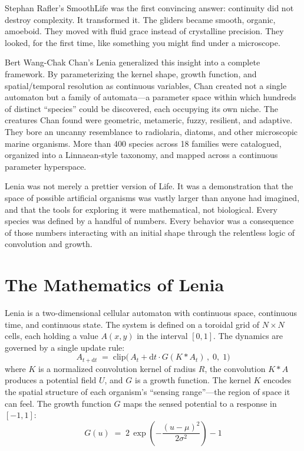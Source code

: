 \documentclass[11pt,a4paper]{article}
\begin{document}
Stephan Rafler's SmoothLife \citep{rafler2011} was the first convincing
answer: continuity did not destroy complexity. It transformed it. The
gliders became smooth, organic, amoeboid. They moved with fluid grace
instead of crystalline precision. They looked, for the first time, like
something you might find under a microscope.

Bert Wang-Chak Chan's Lenia \citep{chan2019,chan2020} generalized this
insight into a complete framework. By parameterizing the kernel shape,
growth function, and spatial/temporal resolution as continuous variables,
Chan created not a single automaton but a family of automata---a parameter
space within which hundreds of distinct ``species'' could be discovered,
each occupying its own niche. The creatures Chan found were geometric,
metameric, fuzzy, resilient, and adaptive. They bore an uncanny resemblance
to radiolaria, diatoms, and other microscopic marine organisms. More than
400 species across 18 families were catalogued, organized into a
Linnaean-style taxonomy, and mapped across a continuous parameter
hyperspace.

Lenia was not merely a prettier version of Life. It was a demonstration that
the space of possible artificial organisms was vastly larger than anyone had
imagined, and that the tools for exploring it were mathematical, not
biological. Every species was defined by a handful of numbers. Every
behavior was a consequence of those numbers interacting with an initial
shape through the relentless logic of convolution and growth.

\section{The Mathematics of Lenia}

Lenia is a two-dimensional cellular automaton with continuous space,
continuous time, and continuous state. The system is defined on a toroidal
grid of $N\times N$ cells, each holding a value $A(x,y)$ in the interval
$[0,1]$. The dynamics are governed by a single update rule:
\begin{equation}
A_{t+\mathrm{d}t} \;=\; \mathrm{clip}\bigl(\,A_{t} + \mathrm{d}t\cdot G(K * A_{t})\,,\;0,\;1\bigr)
\end{equation}
where $K$ is a normalized convolution kernel of radius $R$, the convolution
$K * A$ produces a potential field $U$, and $G$ is a growth function. The
kernel $K$ encodes the spatial structure of each organism's ``sensing
range''---the region of space it can feel. The growth function $G$ maps the
sensed potential to a response in $[-1,1]$:
\begin{equation}
G(u) \;=\; 2\,\exp\!\left(-\frac{(u-\mu)^{2}}{2\sigma^{2}}\right) - 1
\end{equation}
\end{document}
